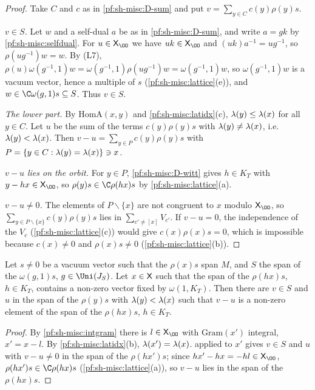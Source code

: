 \begin{proof}
Take $C$ and $c$ as in \ref{pf:sh-misc:D-sum} and put $v=\sum_{y\in C}c(y)\rho(y)s$.

\emph{$v\in S$.} Let $w$ and a self-dual $a$ be as in \ref{pf:sh-misc:D-sum}, and write $a=gk$ by \cref{pf:sh-misc:selfdual}. For $u\in\shmiscXO$ we have
$uk\in\shmiscXO$ and $(uk)a^{-1}=ug^{-1}$, so $\rho(ug^{-1})w=w$. By (L7),
$\rho(u)\omega(g^{-1},1)w=\omega(g^{-1},1)\rho(ug^{-1})w=\omega(g^{-1},1)w$, so $\omega(g^{-1},1)w$ is a vacuum vector, hence a multiple of $s$
(\cref{pf:sh-misc:lattice}(e)), and $w\in\C\omega(g,1)s\subseteq S$. Thus $v\in S$.

\emph{The lower part.} By $\mathrm{HomA}(x,y)$ and \cref{pf:sh-misc:latidx}(c), $\lambda(y)\le\lambda(x)$ for all $y\in C$. Let $u$ be the sum of
the terms $c(y)\rho(y)s$ with $\lambda(y)\ne\lambda(x)$, i.e.\ $\lambda(y)<\lambda(x)$. Then $v-u=\sum_{y\in P}c(y)\rho(y)s$ with
$P=\{y\in C:\lambda(y)=\lambda(x)\}\ni x$.

\emph{$v-u$ lies on the orbit.} For $y\in P$, \ref{pf:sh-misc:D-witt} gives $h\in K_T$ with $y-hx\in\shmiscXO$, so $\rho(y)s\in\C\rho(hx)s$ by
\cref{pf:sh-misc:lattice}(a).

\emph{$v-u\ne0$.} The elements of $P\smallsetminus\{x\}$ are not congruent to $x$ modulo $\shmiscXO$, so $\sum_{y\in P\smallsetminus\{x\}}c(y)\rho(y)s$ lies
in $\sum_{c'\ne[x]}V_{c'}$. If $v-u=0$, the independence of the $V_c$ (\cref{pf:sh-misc:lattice}(c)) would give $c(x)\rho(x)s=0$, which is
impossible because $c(x)\ne0$ and $\rho(x)s\ne0$ (\cref{pf:sh-misc:lattice}(b)).
\end{proof}

\begin{proposition}\label{pf:sh-misc:howestep}
Let $s\ne0$ be a vacuum vector such that the $\rho(x)s$ span $M$, and $S$ the span of the $\omega(g,1)s$, $g\in\Uni(J_S)$. Let $x\in\mathsf X$
such that the span of the $\rho(hx)s$, $h\in K_T$, contains a non-zero vector fixed by $\omega(1,K_T)$. Then there are $v\in S$ and $u$ in the
span of the $\rho(y)s$ with $\lambda(y)<\lambda(x)$ such that $v-u$ is a non-zero element of the span of the $\rho(hx)s$, $h\in K_T$.
\end{proposition}

\begin{proof}
By \cref{pf:sh-misc:intgram} there is $l\in\shmiscXO$ with $\mathrm{Gram}(x')$ integral, $x'=x-l$. By \cref{pf:sh-misc:latidx}(b),
$\lambda(x')=\lambda(x)$.  applied to $x'$ gives $v\in S$ and $u$ with $v-u\ne0$ in the span of the
$\rho(hx')s$; since $hx'-hx=-hl\in\shmiscXO$, $\rho(hx')s\in\C\rho(hx)s$ (\cref{pf:sh-misc:lattice}(a)), so $v-u$ lies in the span of the
$\rho(hx)s$.
\end{proof}

